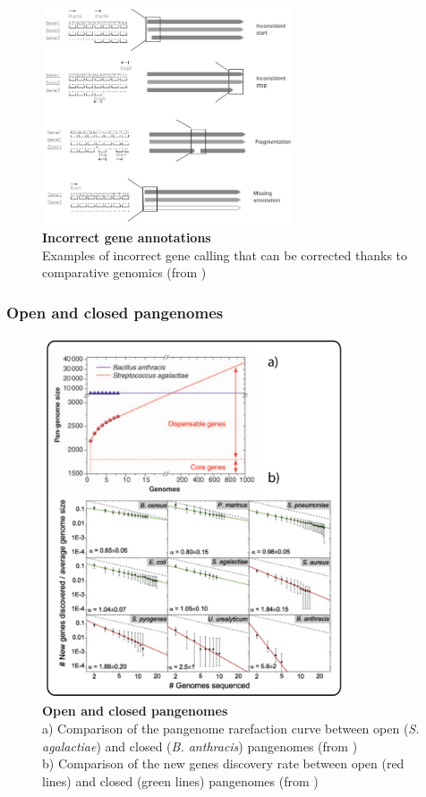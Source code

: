\begin{figure}[!tb]
	\center
    \includegraphics[width=0.66\textwidth]{figures/Introduction/thesis_12}
	\caption{\label{fig:mugsy}\textbf{Incorrect gene annotations}\\
			 Examples of incorrect gene calling that can be corrected thanks to comparative genomics (from \cite{samuel12improving})}
\end{figure}

\subsubsection{Open and closed pangenomes}
\begin{figure}[!tb]
	\center
    \includegraphics[width=0.8\textwidth]{figures/Introduction/thesis_13}
	\caption{\label{fig:openclosed}\textbf{Open and closed pangenomes}\\
			a) Comparison of the pangenome rarefaction curve between open (\textit{S. agalactiae}) and closed (\textit{B. anthracis}) pangenomes (from \cite{medini2005microbial})\\
			b) Comparison of the new genes discovery rate between open (red lines) and closed (green lines) pangenomes (from \cite{tettelin2008comparative})}
\end{figure}

